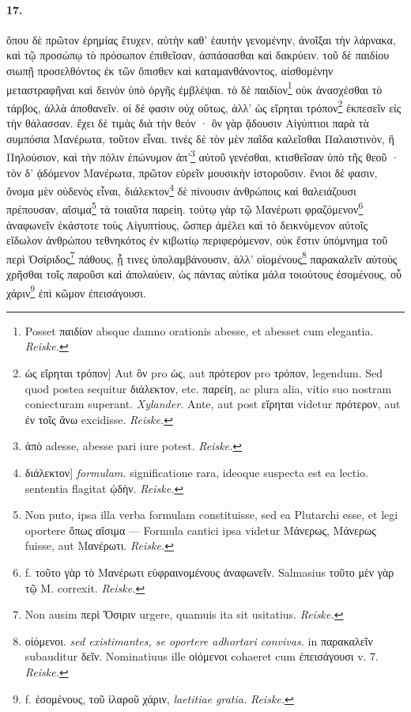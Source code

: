\documentclass[a4paper, 11pt, oneside, polutonikogreek, german]{article}
\begin{document}
\paragraph{17.}
ὅπου δὲ πρῶτον ἐρημίας ἔτυχεν, αὐτὴν καθ' ἑαυτὴν γενομένην, ἀνοῖξαι τὴν λάρνακα, καὶ τῷ προσώπῳ τὸ πρόσωπον ἐπιθεῖσαν, ἀσπάσασθαι καὶ δακρύειν. τοῦ δὲ παιδίου σιωπῇ προσελθόντος ἐκ τῶν ὄπισθεν καὶ καταμανθάνοντος, αἰσθομένην μεταστραφῆναι καὶ δεινὸν ὑπὸ ὀργῆς ἐμβλέψαι. τὸ δὲ παιδίον\footnote{Posset παιδίον absque damno orationis abesse, et abesset cum elegantia. \emph{Reiske.}} οὐκ ἀνασχέσθαι τὸ τάρβος, ἀλλὰ ἀποθανεῖν. οἱ δέ φασιν οὐχ οὕτως, ἀλλ' ὡς εἴρηται τρόπον\footnote{ὡς εἴρηται τρόπον] Aut ὃν pro ὡς, aut πρότερον pro τρόπον, legendum. Sed quod postea sequitur διάλεκτον, etc. παρείη, ac plura alia, vitio suo nostram coniecturam superant. \emph{Xylander.} Ante, aut post εἴρηται videtur πρότερον, aut ἐν τοῖς ἂνω excidisse. \emph{Reiske.}} ἐκπεσεῖν εἰς τὴν θάλασσαν. ἔχει δὲ τιμὰς διὰ τὴν θεόν · ὃν γὰρ ᾄδουσιν Αἰγύπτιοι παρὰ τὰ συμπόσια Μανέρωτα, τοῦτον εἶναι. τινὲς δὲ τὸν μὲν παῖδα καλεῖσθαι Παλαιστινὸν, ἢ Πηλούσιον, καὶ τὴν πόλιν ἐπώνυμον ἀπ'\footnote{ἀπὸ adesse, abesse pari iure potest. \emph{Reiske.}} αὐτοῦ γενέσθαι, κτισθεῖσαν ὑπὸ τῆς θεοῦ · τὸν δ' ᾀδόμενον Μανέρωτα, πρῶτον εὑρεῖν μουσικὴν ἱστοροῦσιν. ἔνιοι δέ φασιν, ὄνομα μὲν οὐδενὸς εἶναι, διάλεκτον\footnote{διάλεκτον] \emph{formulam.} significatione rara, ideoque suspecta est ea lectio. sententia flagitat ᾠδὴν. \emph{Reiske.}} δὲ πίνουσιν ἀνθρώποις καὶ θαλειάζουσι πρέπουσαν, αἴσιμα\footnote{Non puto, ipsa illa verba formulam constituisse, sed ea Plutarchi esse, et legi oportere ὅπως αἴσιμα --- Formula cantici ipsa videtur Μάνερως, Μάνερως fuisse, aut Μανέρωτι. \emph{Reiske.}} τὰ τοιαῦτα παρείη. τούτῳ γὰρ τῷ Μανέρωτι φραζόμενον\footnote{f. τοῦτο γὰρ τὸ Μανέρωτι εὐφραινομένους ἀναφωνεῖν. Salmasius τοῦτο μὲν γὰρ τῷ Μ. correxit. \emph{Reiske.}} ἀναφωνεῖν ἑκάστοτε τοὺς Αἰγυπτίους, ὥσπερ ἀμέλει καὶ τὸ δεικνύμενον αὐτοῖς εἴδωλον ἀνθρώπου τεθνηκότος ἐν κιβωτίῳ περιφερόμενον, οὐκ ἔστιν ὑπόμνημα τοῦ περὶ Ὀσίριδος\footnote{Non ausim περὶ Ὄσιριν urgere, quamuis ita sit usitatius. \emph{Reiske.}} πάθους, ᾗ τινες ὑπολαμβάνουσιν, ἀλλ' οἰομένους\footnote{οἰόμενοι. \emph{sed existimantes, se oportere adhortari convivas.} in παρακαλεῖν subauditur δεῖν. Nominatiuus ille οἰόμενοι cohaeret cum ἐπεισάγουσι v. 7. \emph{Reiske.}} παρακαλεῖν αὑτοὺς χρῆσθαι τοῖς παροῦσι καὶ ἀπολαύειν, ὡς πάντας αὐτίκα μάλα τοιούτους ἐσομένους, οὗ χάριν\footnote{f. ἐσομένους, τοῦ ἱλαροῦ χάριν, \emph{laetitiae gratia.} \emph{Reiske.}} ἐπὶ κῶμον ἐπεισάγουσι.
\end{document}
